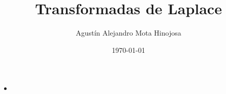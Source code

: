 \documentclass[11pt]{article}
\author{Agustín Alejandro Mota Hinojosa}
\date{\today}
\title{Transformadas de Laplace}
\begin{document}
\maketitle
\tableofcontents

\begin{itemize}
\item {}
\end{itemize}
\end{document}

